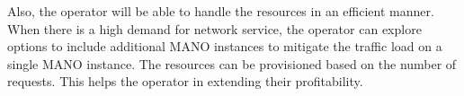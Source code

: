  Also, the operator will be able to handle the resources in an efficient manner. 
When there is a high demand for network service, the operator can explore options to include additional MANO instances to mitigate the traffic load on a single MANO instance. The resources can be provisioned based on the number of requests. This helps the operator in extending their profitability. 

























